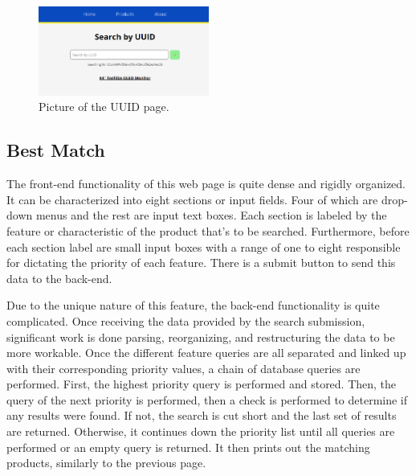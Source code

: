 \documentclass[sigconf]{acmart}
\begin{document}
\begin{figure}[H] %
	\centering %
	\includegraphics[width=0.5\textwidth]{Figures/exactmatch.png} %
	\caption{Picture of the UUID page.}
\end{figure}

\subsection{Best Match}\label{best}
The front-end functionality of this web page is quite dense and rigidly organized. It can be characterized into eight sections or input fields.
Four of which are drop-down menus and the rest are input text boxes. Each section is labeled by the feature or characteristic of the product that's to be searched. Furthermore, before each section label are small input boxes with a range of one to eight responsible for dictating the priority of each feature. There is a submit button to send this data to the back-end. \par
Due to the unique nature of this feature, the back-end functionality is quite complicated. Once receiving the data provided by the search submission, significant work is done parsing, reorganizing, and restructuring the data to be more workable. Once the different feature queries are all separated and linked up with their corresponding priority values, a chain of database queries are performed. First, the highest priority query is performed and stored. Then, the query of the next priority is performed, then a check is performed to determine if any results were found. If not, the search is cut short and the last set of results are returned. Otherwise, it continues down the priority list until all queries are performed or an empty query is returned. It then prints out the matching products, similarly to the previous page.
\end{document}
